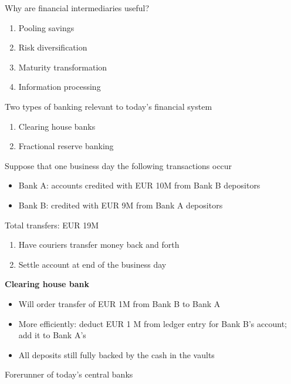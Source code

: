 \documentclass{beamer}
\begin{document}
\begin{frame}
 Why are financial intermediaries useful?
\begin{enumerate}
  \item Pooling savings  
  \item Risk diversification
  \item Maturity transformation
  \item Information processing  
\end{enumerate}
\end{frame}

\begin{frame}
 Two types of banking relevant to today's financial system
\begin{enumerate}
  \item Clearing house banks
  \item Fractional reserve banking
\end{enumerate}
\end{frame}

\begin{frame}
  Suppose that one business day the following transactions occur
\begin{itemize}
  \item Bank A: accounts credited with EUR 10M from Bank B depositors
  \item Bank B: credited with EUR 9M from Bank A depositors
\end{itemize}
 \medskip
 Total transfers: EUR 19M\\
 \begin{enumerate}
   \item Have couriers transfer money back and forth
   \item Settle account at end of the business day
 \end{enumerate}
\end{frame}

\begin{frame}
  \textbf{Clearing house bank}
  \begin{itemize}
  \item Will order transfer of EUR 1M from Bank B to Bank A
  \item More efficiently: deduct EUR 1 M from ledger entry for Bank B's account; add it to Bank A's
  \item All deposits still fully backed by the cash in the vaults
\end{itemize}
\medskip
Forerunner of today's central banks
\end{frame}
\end{document}
